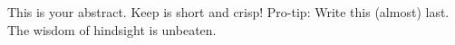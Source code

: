 \documentclass[thesis.tex]{subfiles}
\begin{document}

This is your abstract. Keep is short and crisp!
Pro-tip: Write this (almost) last. The wisdom of hindsight is unbeaten.
\end{document}
